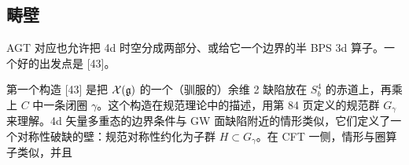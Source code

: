 \subsection{畴壁}

AGT 对应也允许把 4d 时空分成两部分、或给它一个边界的半 BPS 3d 算子。一个好的出发点是 [43]。

 第一个构造 [43] 是把 $\mathcal{X}(\mathfrak{g})$ 的一个（驯服的）余维 2 缺陷放在 $S^4_b$ 的赤道上，再乘上 $C$ 中一条闭圈 $\gamma$。这个构造在规范理论中的描述，用第 84 页定义的规范群 $G_\gamma$ 来理解。4d 矢量多重态的边界条件与 GW 面缺陷附近的情形类似，它们定义了一个对称性破缺的壁：规范对称性约化为子群 $H\subset G_\gamma$。在 CFT 一侧，情形与圈算子类似，并且
